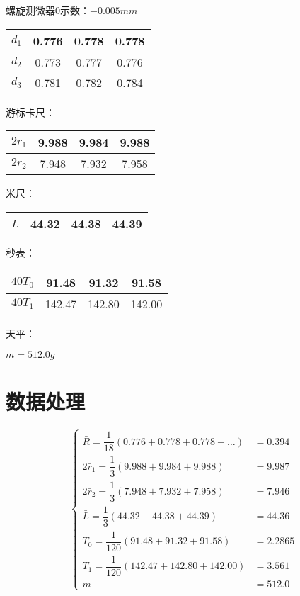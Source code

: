 \documentclass[a4paper]{ltxdoc}
\begin{document}
\begin{multicols}{2}
  \smallskip
  螺旋测微器$0$示数：$-0.005mm$
  \smallskip

  \begin{tabular}{|c|c|c|c|}
    \hline \textit{$d_1$} & 0.776 & 0.778 & 0.778 \\
    \hline \textit{$d_2$} & 0.773 & 0.777 & 0.776 \\
    \hline \textit{$d_3$} & 0.781 & 0.782 & 0.784 \\\hline
  \end{tabular}

  \smallskip
  游标卡尺：
  \smallskip

  \begin{tabular}{|c|c|c|c|}
    \hline $2r_1$ & 9.988 & 9.984 & 9.988 \\
    \hline $2r_2$ & 7.948 & 7.932 & 7.958 \\\hline
  \end{tabular}

  \smallskip
  米尺：
  \smallskip

  \begin{tabular}{|c|c|c|c|}
    \hline $L$ & 44.32 & 44.38 & 44.39 \\\hline
  \end{tabular}

  \smallskip
  秒表：
  \smallskip

  \begin{tabular}{|c|c|c|c|}
    \hline $40T_0$ & 91.48  & 91.32  & 91.58  \\
    \hline $40T_1$ & 142.47 & 142.80 & 142.00 \\\hline
  \end{tabular}

  \smallskip
  天平：
  \smallskip

  $m = 512.0 g$

  \section{数据处理}

  \begin{equation}
    \left\{
    \begin{aligned}
      \bar R = \dfrac 1 {18} (0.776 + 0.778 + 0.778 + \ldots ) & = 0.394  \\
      2\bar r_1 = \dfrac{1}{3}(9.988 + 9.984 + 9.988)          & = 9.987  \\
      2\bar r_2 = \dfrac{1}{3}(7.948 + 7.932 + 7.958)          & = 7.946  \\
      \bar L = \dfrac{1}{3}(44.32 + 44.38 + 44.39)             & = 44.36  \\
      \bar T_0 = \dfrac{1}{120}(91.48 + 91.32 + 91.58)         & = 2.2865 \\
      \bar T_1 = \dfrac{1}{120}(142.47 + 142.80 + 142.00)      & = 3.561  \\
      m                                                        & = 512.0
    \end{aligned}
    \right.
  \end{equation}


\end{multicols}
\end{document}
